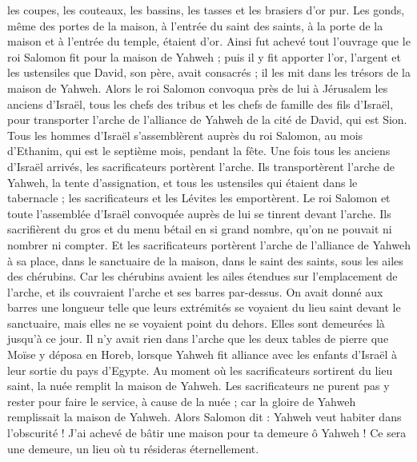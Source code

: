 \begin{multicols}{2}
les coupes, les couteaux, les bassins, les tasses et les brasiers d’or pur. Les gonds, même des portes de la maison, à l’entrée du saint des saints, à la porte de la maison et à l’entrée du temple, étaient d'or.
Ainsi fut achevé tout l'ouvrage que le roi Salomon fit pour la maison de Yahweh ; puis il y fit apporter l'or, l’argent et les ustensiles que David, son père, avait consacrés ; il les mit dans les trésors de la maison de Yahweh.
\VerseOne{}Alors le roi Salomon convoqua près de lui à Jérusalem les anciens d'Israël, tous les chefs des tribus et les chefs de famille des fils d'Israël, pour transporter l'arche de l'alliance de Yahweh de la cité de David, qui est Sion.
Tous les hommes d'Israël s’assemblèrent auprès du roi Salomon, au mois d'Ethanim, qui est le septième mois, pendant la fête.
Une fois tous les anciens d'Israël arrivés, les sacrificateurs portèrent l'arche.
Ils transportèrent l'arche de Yahweh, la tente d'assignation, et tous les ustensiles qui étaient dans le tabernacle ; les sacrificateurs et les Lévites les emportèrent.
Le roi Salomon et toute l'assemblée d'Israël convoquée auprès de lui se tinrent devant l'arche. Ils sacrifièrent du gros et du menu bétail en si grand nombre, qu'on ne pouvait ni nombrer ni compter.
Et les sacrificateurs portèrent l'arche de l'alliance de Yahweh à sa place, dans le sanctuaire de la maison, dans le saint des saints, sous les ailes des chérubins.
Car les chérubins avaient les ailes étendues sur l’emplacement de l'arche, et ils couvraient l'arche et ses barres par-dessus.
On avait donné aux barres une longueur telle que leurs extrémités se voyaient du lieu saint devant le sanctuaire, mais elles ne se voyaient point du dehors. Elles sont demeurées là jusqu'à ce jour.
Il n'y avait rien dans l'arche que les deux tables de pierre que Moïse y déposa en Horeb, lorsque Yahweh fit alliance avec les enfants d'Israël à leur sortie du pays d'Egypte.
Au moment où les sacrificateurs sortirent du lieu saint, la nuée remplit la maison de Yahweh.
Les sacrificateurs ne purent pas y rester pour faire le service, à cause de la nuée ; car la gloire de Yahweh remplissait la maison de Yahweh.
Alors Salomon dit : Yahweh veut habiter dans l'obscurité !
J'ai achevé de bâtir une maison pour ta demeure ô Yahweh ! Ce sera une demeure, un lieu où tu résideras éternellement.

\end{multicols}

